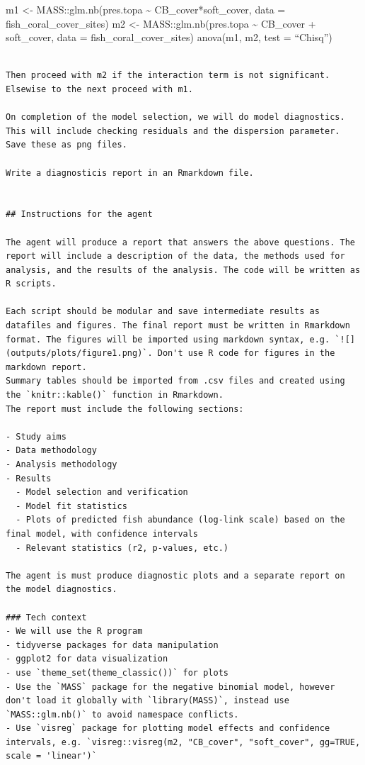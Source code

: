 \documentclass[
  letterpaper,
  DIV=11,
  numbers=noendperiod]{scrreprt}
\begin{document}
m1 \textless- MASS::glm.nb(pres.topa \textasciitilde{}
CB\_cover*soft\_cover, data = fish\_coral\_cover\_sites) m2 \textless-
MASS::glm.nb(pres.topa \textasciitilde{} CB\_cover + soft\_cover, data =
fish\_coral\_cover\_sites) anova(m1, m2, test = ``Chisq'')

\begin{verbatim}

Then proceed with m2 if the interaction term is not significant. Elsewise to the next proceed with m1.

On completion of the model selection, we will do model diagnostics. This will include checking residuals and the dispersion parameter. Save these as png files. 

Write a diagnosticis report in an Rmarkdown file. 


## Instructions for the agent

The agent will produce a report that answers the above questions. The report will include a description of the data, the methods used for analysis, and the results of the analysis. The code will be written as R scripts. 

Each script should be modular and save intermediate results as datafiles and figures. The final report must be written in Rmarkdown format. The figures will be imported using markdown syntax, e.g. `![](outputs/plots/figure1.png)`. Don't use R code for figures in the markdown report. 
Summary tables should be imported from .csv files and created using the `knitr::kable()` function in Rmarkdown. 
The report must include the following sections:

- Study aims
- Data methodology
- Analysis methodology
- Results
  - Model selection and verification
  - Model fit statistics
  - Plots of predicted fish abundance (log-link scale) based on the final model, with confidence intervals
  - Relevant statistics (r2, p-values, etc.)

The agent is must produce diagnostic plots and a separate report on the model diagnostics. 

### Tech context
- We will use the R program
- tidyverse packages for data manipulation
- ggplot2 for data visualization
- use `theme_set(theme_classic())` for plots
- Use the `MASS` package for the negative binomial model, however don't load it globally with `library(MASS)`, instead use `MASS::glm.nb()` to avoid namespace conflicts.
- Use `visreg` package for plotting model effects and confidence intervals, e.g. `visreg::visreg(m2, "CB_cover", "soft_cover", gg=TRUE, scale = 'linear')`


\end{verbatim}
\end{document}
